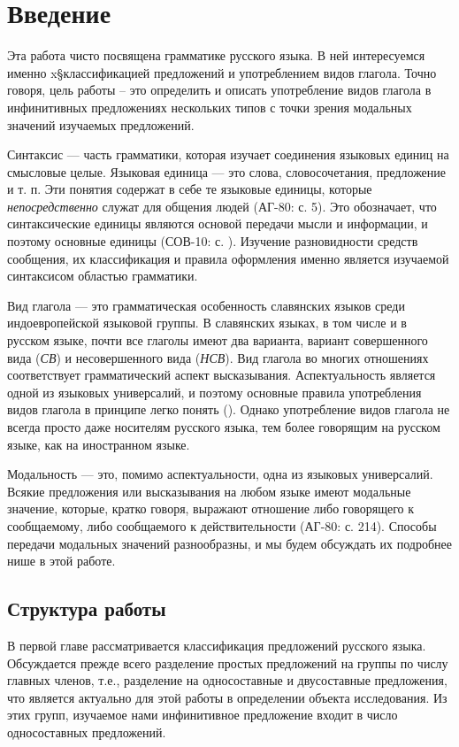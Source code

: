 \section{Введение}

Эта работа чисто посвящена грамматике русского языка. В ней интересуемся именно x§классификацией предложений и употреблением видов глагола. Точно говоря, цель работы -- это определить и описать употребление видов глагола в инфинитивных предложениях нескольких типов с точки зрения модальных значений изучаемых предложений.

Синтаксис --- часть грамматики, которая изучает соединения языковых единиц на смысловые целые. Языковая единица --- это слова, словосочетания, предложение и т. п. Эти понятия содержат в себе те языковые единицы, которые \textit{непосредственно} служат для общения людей (АГ-80: с. 5). Это обозначает, что синтаксические единицы являются основой передачи мысли и информации, и поэтому основные единицы (СОВ-10: с. ). Изучение разновидности средств сообщения, их классификация и правила оформления именно является изучаемой синтаксисом областью грамматики.

Вид глагола --- это грамматическая особенность славянских языков среди индоевропейской языковой группы. В славянских языках, в том числе и в русском языке, почти все глаголы имеют два варианта, вариант совершенного вида (\textit{СВ}) и несовершенного вида (\textit{НСВ}). Вид глагола во многих отношениях соответствует грамматический аспект высказывания. Аспектуальность является одной из языковых универсалий, и поэтому основные правила употребления видов глагола в принципе легко понять (). Однако употребление видов глагола не всегда просто даже носителям русского языка, тем более говорящим на русском языке, как на иностранном языке.

Модальность --- это, помимо аспектуальности, одна из языковых универсалий. Всякие предложения или высказывания на любом языке имеют модальные значение, которые, кратко говоря, выражают отношение либо говорящего к сообщаемому, либо сообщаемого к действительности (АГ-80: с. 214). Способы передачи модальных значений разнообразны, и мы будем обсуждать их подробнее нише в этой работе.

\subsection{Структура работы}

В первой главе рассматривается классификация предложений русского языка. Обсуждается прежде всего разделение простых предложений на группы по числу главных членов, т.е., разделение на односоставные и двусоставные предложения, что является актуально для этой работы в определении объекта исследования. Из этих групп, изучаемое нами инфинитивное предложение входит в число односоставных предложений.


